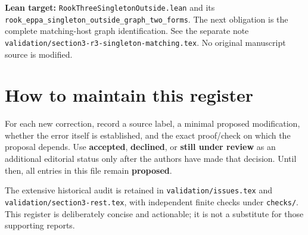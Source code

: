 \documentclass[11pt,a4paper]{article}
\begin{document}
\textbf{Lean target:}
\texttt{RookThreeSingletonOutside.lean} and its
\texttt{rook\_eppa\_singleton\_outside\_graph\_two\_forms}.
The next obligation is the complete matching-host
graph identification. See the separate note
\texttt{validation/section3-r3-singleton-matching.tex}.
No original manuscript source is modified.

\section*{How to maintain this register}
For each new correction, record a source label,
a minimal proposed modification, whether the
error itself is established, and the exact
proof/check on which the proposal depends.
Use \textbf{accepted}, \textbf{declined}, or
\textbf{still under review} as an additional
editorial status only after the authors have
made that decision. Until then, all entries in
this file remain \textbf{proposed}.

The extensive historical audit is retained in
\texttt{validation/issues.tex} and
\texttt{validation/section3-rest.tex}, with independent
finite checks under \texttt{checks/}.
This register is deliberately concise and
actionable; it is not a substitute for those
supporting reports.
\end{document}
